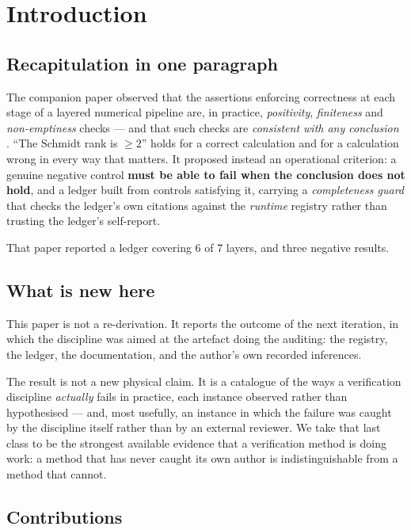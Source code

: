 \documentclass[11pt,a4paper]{article}
\begin{document}
\section{Introduction}
\label{sec:intro}

\subsection{Recapitulation in one paragraph}

The companion paper \cite{v15paper} observed that the assertions enforcing
correctness at each stage of a layered numerical pipeline are, in practice,
\emph{positivity}, \emph{finiteness} and \emph{non-emptiness} checks --- and that
such checks are \emph{consistent with any conclusion} \cite{popper}. ``The
Schmidt rank is $\ge 2$'' holds for a correct calculation and for a calculation
wrong in every way that matters. It proposed instead an operational criterion: a
genuine negative control \textbf{must be able to fail when the conclusion does
not hold}, and a ledger built from controls satisfying it, carrying a
\emph{completeness guard} that checks the ledger's own citations against the
\emph{runtime} registry rather than trusting the ledger's self-report.

That paper reported a ledger covering 6 of 7 layers, and three negative
results.

\subsection{What is new here}

This paper is not a re-derivation. It reports the outcome of the next
iteration, in which the discipline was aimed at the artefact doing the
auditing: the registry, the ledger, the documentation, and the author's own
recorded inferences.

The result is not a new physical claim. It is a catalogue of the ways a
verification discipline \emph{actually} fails in practice, each instance
observed rather than hypothesised --- and, most usefully, an instance in which
the failure was caught by the discipline itself rather than by an external
reviewer. We take that last class to be the strongest available evidence that a
verification method is doing work: a method that has never caught its own
author is indistinguishable from a method that cannot.

\subsection{Contributions}
\end{document}
